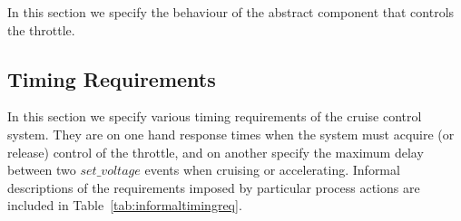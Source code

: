\documentclass{article}
\begin{document}
In this section we specify the behaviour of the abstract component that controls the throttle.
%


\newpage


\subsection{Timing Requirements}

In this section we specify various timing requirements of the cruise control system. They are on one hand response times when the system must acquire (or release) control of the throttle, and on another specify the maximum delay between two $set\_voltage$ events when cruising or accelerating. Informal descriptions of the requirements imposed by particular process actions are included in Table~\ref{tab:informaltimingreq}.
%

\end{document}
